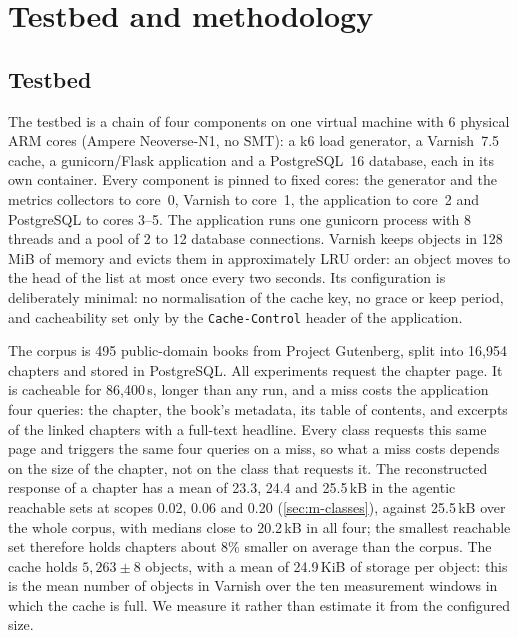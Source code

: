 \section{Testbed and methodology}\label{sec:method}

\subsection{Testbed}\label{sec:m-testbed}
The testbed is a chain of four components on one virtual machine with 6 physical ARM
cores (Ampere Neoverse-N1, no SMT): a k6 load generator, a Varnish~7.5
cache, a gunicorn/Flask application and a PostgreSQL~16 database, each in its own
container.
Every component is pinned to fixed cores: the generator and the metrics collectors to
core~0, Varnish to core~1, the application to core~2 and PostgreSQL to cores
3--5.
The application runs one gunicorn process with 8 threads and a pool of 2 to 12 database
connections.
Varnish keeps objects in 128\,MiB of memory and evicts them in approximately LRU order: an
object moves to the head of the list at most once every two seconds.
Its configuration is deliberately minimal: no normalisation of the cache key, no grace or
keep period, and cacheability set only by the \texttt{Cache-Control} header of the
application.

The corpus is 495 public-domain books from Project Gutenberg, split into 16,954 chapters
and stored in PostgreSQL.
All experiments request the chapter page.
It is cacheable for 86,400\,s, longer than any run, and a miss costs the application four
queries: the chapter, the book's metadata, its table of contents, and excerpts of the
linked chapters with a full-text headline.
Every class requests this same page and triggers the same four queries on a miss, so what
a miss costs depends on the size of the chapter, not on the class that requests it.
The reconstructed response of a chapter has a mean of 23.3, 24.4 and 25.5\,kB in the
agentic reachable sets at scopes 0.02, 0.06 and 0.20 (\cref{sec:m-classes}), against
25.5\,kB over the whole corpus, with medians close to 20.2\,kB in all four; the smallest
reachable set therefore holds chapters about 8\% smaller on average than the corpus.
The cache holds $5{,}263 \pm 8$ objects, with a mean of 24.9\,KiB of storage per object:
this is the mean number of objects in Varnish over the ten measurement windows in which
the cache is full.
We measure it rather than estimate it from the configured size.

